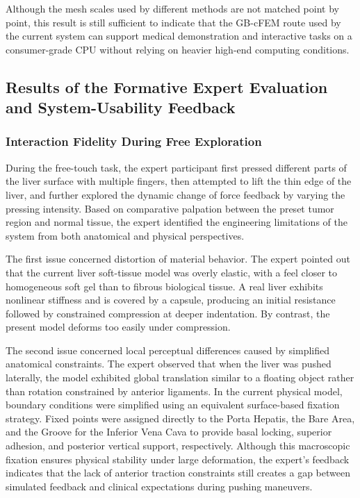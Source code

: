 \documentclass{ieeeaccess}
\begin{document}
Although the mesh scales used by different methods are not matched point by point, this result is still sufficient to indicate that the GB-cFEM route used by the current system can support medical demonstration and interactive tasks on a consumer-grade CPU without relying on heavier high-end computing conditions.

\subsection{Results of the Formative Expert Evaluation and System-Usability Feedback}
\subsubsection{Interaction Fidelity During Free Exploration}
During the free-touch task, the expert participant first pressed different parts of the liver surface with multiple fingers, then attempted to lift the thin edge of the liver, and further explored the dynamic change of force feedback by varying the pressing intensity. Based on comparative palpation between the preset tumor region and normal tissue, the expert identified the engineering limitations of the system from both anatomical and physical perspectives.

The first issue concerned distortion of material behavior. The expert pointed out that the current liver soft-tissue model was overly elastic, with a feel closer to homogeneous soft gel than to fibrous biological tissue. A real liver exhibits nonlinear stiffness and is covered by a capsule, producing an initial resistance followed by constrained compression at deeper indentation. By contrast, the present model deforms too easily under compression.

The second issue concerned local perceptual differences caused by simplified anatomical constraints. The expert observed that when the liver was pushed laterally, the model exhibited global translation similar to a floating object rather than rotation constrained by anterior ligaments. In the current physical model, boundary conditions were simplified using an equivalent surface-based fixation strategy. Fixed points were assigned directly to the Porta Hepatis, the Bare Area, and the Groove for the Inferior Vena Cava to provide basal locking, superior adhesion, and posterior vertical support, respectively. Although this macroscopic fixation ensures physical stability under large deformation, the expert's feedback indicates that the lack of anterior traction constraints still creates a gap between simulated feedback and clinical expectations during pushing maneuvers.
\end{document}
